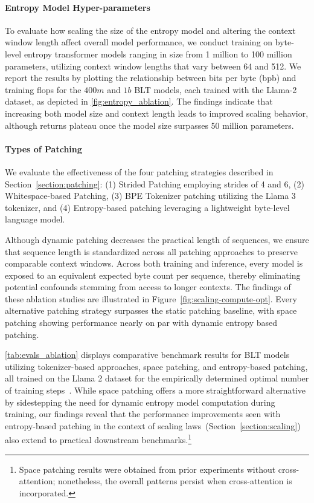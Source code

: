 \paragraph{Entropy Model Hyper-parameters} To evaluate how scaling the size of the entropy model and altering the context window length affect overall model performance, we conduct training on byte-level entropy transformer models ranging in size from 1 million to 100 million parameters, utilizing context window lengths that vary between 64 and 512. We report the results by plotting the relationship between bits per byte (bpb) and training flops for the $400m$ and $1b$ {\textsc BLT} models, each trained with the Llama-2 dataset, as depicted in \autoref{fig:entropy_ablation}. The findings indicate that increasing both model size and context length leads to improved scaling behavior, although returns plateau once the model size surpasses 50 million parameters.

\paragraph{Types of Patching}

We evaluate the effectiveness of the four patching strategies described in Section~\ref{section:patching}: (1) Strided Patching employing strides of 4 and 6, (2) Whitespace-based Patching, (3) BPE Tokenizer patching utilizing the Llama 3 tokenizer, and (4) Entropy-based patching leveraging a lightweight byte-level language model.

Although dynamic patching decreases the practical length of sequences, we ensure that sequence length is standardized across all patching approaches to preserve comparable context windows. Across both training and inference, every model is exposed to an equivalent expected byte count per sequence, thereby eliminating potential confounds stemming from access to longer contexts. The findings of these ablation studies are illustrated in Figure~\ref{fig:scaling-compute-opt}. Every alternative patching strategy surpasses the static patching baseline, with space patching showing performance nearly on par with dynamic entropy based patching.

\autoref{tab:evals_ablation} displays comparative benchmark results for {\textsc BLT} models utilizing tokenizer-based approaches, space patching, and entropy-based patching, all trained on the Llama 2 dataset for the empirically determined optimal number of training steps~\citep{dubey2024llama}. While space patching offers a more straightforward alternative by sidestepping the need for dynamic entropy model computation during training, our findings reveal that the performance improvements seen with entropy-based patching in the context of scaling laws~(Section~\ref{section:scaling}) also extend to practical downstream benchmarks.\footnote{Space patching results were obtained from prior experiments without cross-attention; nonetheless, the overall patterns persist when cross-attention is incorporated.}

